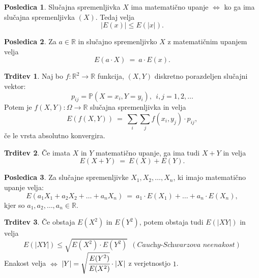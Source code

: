 \documentclass[11pt]{article}
\theoremstyle{definition}
\theoremstyle{definition}
\newtheorem{trditev}{Trditev}[section]
\theoremstyle{definition}
\newtheorem*{posledica}{Posledica}
\begin{document}
\begin{posledica}

Slučajna spremenljivka $X$ ima matematično upanje $\Leftrightarrow$ ko ga ima slučajna spremenljivka $(X)$. Tedaj velja
$$|E(x)| \leq E(|x|).$$

\end{posledica}
\vspace{0.5cm}

\begin{posledica}

Za $a \in \mathbb{R}$ in slučajno spremenljivko $X$ z matematičnim upanjem velja
$$E(a \cdot X) ~=~ a \cdot E(x).$$ 

\end{posledica}
\vspace{0.5cm}

\begin{trditev}

Naj bo $f: \mathbb{R}^2 \rightarrow \mathbb{R}$ funkcija, $(X, Y)$ diskretno porazdeljen slučajni vektor:
$$p_{ij} = \mathbb{P}(X = x_i, Y = y_i), ~~i,j = 1, 2, \ldots$$
Potem je $f(X, Y): \Omega \rightarrow \mathbb{R}$ slučajna spremenljivka in velja
$$E(f(X, Y)) ~=~ \sum_i \sum_j f(x_i, y_j) \cdot p_{ij},$$
če le vrsta absolutno konvergira.

\end{trditev}
\vspace{0.5cm}

\begin{trditev}

Če imata $X$ in $Y$ matematično upanje, ga ima tudi $X + Y$ in velja
$$E(X + Y) ~=~ E(X) + E(Y).$$

\end{trditev}
\vspace{0.5cm}

\begin{posledica}

Za slučajne spremenljivke $X_1, X_2, \ldots, X_n$, ki imajo matematično upanje velja:
$$E(a_1 X_1 + a_2 X_2 + \ldots + a_n X_n) ~=~ a_1 \cdot E(X_1) + \ldots + a_n \cdot E(X_n),$$
kjer so $a_1, a_2, \ldots, a_n \in \mathbb{R}$.

\end{posledica}
\vspace{0.5cm}

\begin{trditev}

Če obstaja $E(X^2)$ in $E(Y^2)$, potem obstaja tudi $E(|XY|)$ in velja
$$E(|XY|) \leq \sqrt{E(X^2) \cdot E(Y^2)} ~~(\textit{Cauchy-Schwarzova neenakost})$$
Enakost velja $\Leftrightarrow$ $|Y| = \sqrt{\cfrac{E(Y^2)}{E(X^2)}} \cdot |X|$ z verjetnostjo $1$.

\end{trditev}
\vspace{0.5cm}
\end{document}
